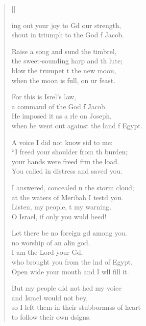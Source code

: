 \settowidth{\versewidth}{so I left them in their stubbornness of heart *}
\begin{verse}[\versewidth]%
  \begin{patverse}
ing out your joy to Gd our strength,\Med\\
shout in triumph to the God f Jacob.

Raise a song and sund the timbrel,\Med\\
the sweet-sounding harp and th lute;\\
blow the trumpet t the new moon,\Med\\
when the moon is full, on ur feast.

For this is Isrel’s law,\Med\\
a command of the God f Jacob.\\
He imposed it as a rle on Joseph,\Med\\
when he went out against the land f Egypt.

A voice I did not know sid to me:\Med\\
“I freed your shoulder from th burden;\\
your hands were freed frm the load.\Med\\
You called in distress and  saved you.

I answered, concealed \pointup{\i}n the storm cloud;\Med\\
at the waters of Meribah I testd you.\\
Listen, my people, t my warning.\Med\\
O Israel, if only you wuld heed!

Let there be no foreign gd among you.\Med\\
no worship of an alin god.\\
I am the Lord your Gd,\Flex\\
who brought you from the lnd of Egypt.\Med\\
Open wide your mouth and I w\pointup{\i}ll fill it.

But my people did not hed my voice\Med\\
and Israel would not bey,\\
so I left them in their stubbornnss of heart\Med\\
to follow their own dsigns.


\end{patverse}
\end{verse}
